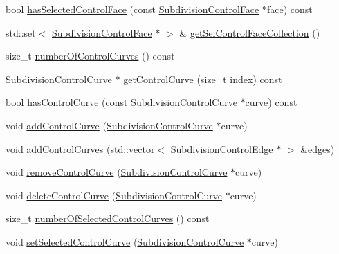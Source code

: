 \begin{DoxyCompactItemize}
\item 
bool \hyperlink{classShipCAD_1_1SubdivisionSurface_aa662c62bcb12861be98da6606f46fc43}{has\+Selected\+Control\+Face} (const \hyperlink{classShipCAD_1_1SubdivisionControlFace}{Subdivision\+Control\+Face} $\ast$face) const 
\item 
std\+::set$<$ \hyperlink{classShipCAD_1_1SubdivisionControlFace}{Subdivision\+Control\+Face} $\ast$ $>$ \& \hyperlink{classShipCAD_1_1SubdivisionSurface_a5c58ee81d873069b4c347f6d35d8a88a}{get\+Sel\+Control\+Face\+Collection} ()
\item 
size\+\_\+t \hyperlink{classShipCAD_1_1SubdivisionSurface_ade9cac86770927d571fa8015093b21a0}{number\+Of\+Control\+Curves} () const 
\item 
\hyperlink{classShipCAD_1_1SubdivisionControlCurve}{Subdivision\+Control\+Curve} $\ast$ \hyperlink{classShipCAD_1_1SubdivisionSurface_a24cef63888acec403e1d938ea96b6406}{get\+Control\+Curve} (size\+\_\+t index) const 
\item 
bool \hyperlink{classShipCAD_1_1SubdivisionSurface_ae5f23d8f2a732032ca2369e2be6f145a}{has\+Control\+Curve} (const \hyperlink{classShipCAD_1_1SubdivisionControlCurve}{Subdivision\+Control\+Curve} $\ast$curve) const 
\item 
void \hyperlink{classShipCAD_1_1SubdivisionSurface_aa01ccc2ce7417960ca13075e38eb98e6}{add\+Control\+Curve} (\hyperlink{classShipCAD_1_1SubdivisionControlCurve}{Subdivision\+Control\+Curve} $\ast$curve)
\item 
void \hyperlink{classShipCAD_1_1SubdivisionSurface_ac26190e7d9525c0e93ddef2479966800}{add\+Control\+Curves} (std\+::vector$<$ \hyperlink{classShipCAD_1_1SubdivisionControlEdge}{Subdivision\+Control\+Edge} $\ast$ $>$ \&edges)
\item 
void \hyperlink{classShipCAD_1_1SubdivisionSurface_abd51f7744580144550fabc086ea991b4}{remove\+Control\+Curve} (\hyperlink{classShipCAD_1_1SubdivisionControlCurve}{Subdivision\+Control\+Curve} $\ast$curve)
\item 
void \hyperlink{classShipCAD_1_1SubdivisionSurface_a8f05e8c3af4f3afd0ced8d8098e03884}{delete\+Control\+Curve} (\hyperlink{classShipCAD_1_1SubdivisionControlCurve}{Subdivision\+Control\+Curve} $\ast$curve)
\item 
size\+\_\+t \hyperlink{classShipCAD_1_1SubdivisionSurface_a0b63ee25a8d0da862fc8f123260e4f7d}{number\+Of\+Selected\+Control\+Curves} () const 
\item 
void \hyperlink{classShipCAD_1_1SubdivisionSurface_a5614a6ea5e1b67ec516328d64574cd9e}{set\+Selected\+Control\+Curve} (\hyperlink{classShipCAD_1_1SubdivisionControlCurve}{Subdivision\+Control\+Curve} $\ast$curve)

\end{DoxyCompactItemize}
